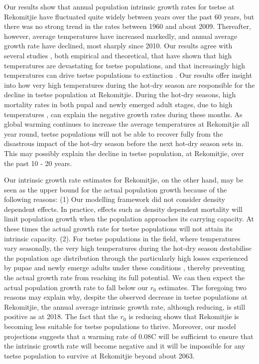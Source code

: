\documentclass[12pt,a4paper]{article}
\begin{document}
Our results show that annual population intrinsic growth rates for tsetse at Rekomitjie have fluctuated quite widely between years over the past 60 years, but there was no strong trend in the rates between 1960 and about 2009. Thereafter, however, average temperatures have increased markedly, and annual average growth rate have declined, most sharply since 2010.  Our results agree with several studies \cite{Pagabeleguem2016f,Ackley2017}, both empirical and theoretical, that have shown that high temperatures are devastating for tsetse populations, and that increasingly high temperatures can drive tsetse populations to extinction \cite{Lord2018,Are2019}. Our results offer insight into how very high temperatures during the hot-dry season are responsible for the decline in tsetse population at Rekomitjie. During the hot-dry seasons, high mortality rates in both pupal and newly emerged adult stages, due to high temperatures \cite{Ackley2017}, can explain the negative growth rates during these months.  As global warming continues to increase the average temperatures at Rekomitjie all year round, tsetse populations will not be able to recover fully from the disastrous impact of the hot-dry season before the next hot-dry season sets in. This may possibly explain the decline in tsetse population, at Rekomitjie, over the past 10 - 20 years. 

Our intrinsic growth rate estimates for Rekomitjie, on the other hand, may  be seen as the upper bound for the actual population growth because of the following reasons: (1) Our modelling framework did not consider density dependent effects. In practice, effects such as density dependent mortality will limit population growth when the population approaches its carrying capacity. At these times the actual growth rate for tsetse populations will not attain its intrinsic capacity. (2). For tsetse populations in the field, where temperatures vary seasonally, the very high temperatures during the hot-dry season destabilise the population age distribution through the particularly high losses experienced by pupae and newly emerge adults under these conditions  \cite{VanSickle1988,Hargrove2013b}, thereby preventing the actual growth rate from reaching its full potential. We can then expect the actual population growth rate to fall below our $r_0$ estimates. The foregoing two reasons may explain why, despite the observed decrease in tsetse populations at Rekomitjie, the annual average intrinsic growth rate, although reducing, is still positive as at 2018. The fact that the $r_0$ is reducing shows that Rekomitjie is becoming less suitable for tsetse populations to thrive. Moreover, our model projections suggests that  a warming rate of 0.08\textdegree C  will be sufficient to ensure that the intrinsic growth rate will become negative and it will be impossible for any tsetse population to survive at Rekomitjie beyond about 2063. 
\end{document}
